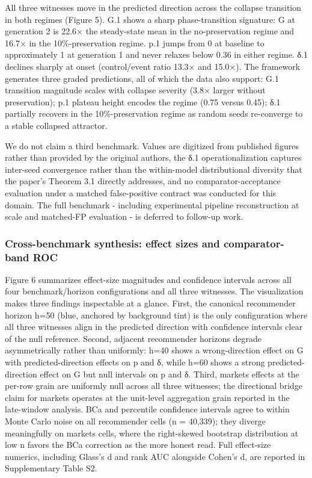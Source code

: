 \documentclass[
  11pt,
]{article}
\begin{document}
All three witnesses move in the predicted direction across the collapse
transition in both regimes (Figure 5). G.1 shows a sharp
phase-transition signature: \textbar G\textbar{} at generation 2 is
22.6× the steady-state mean in the no-preservation regime and 16.7× in
the 10\%-preservation regime. p.1 jumps from 0 at baseline to
approximately 1 at generation 1 and never relaxes below 0.36 in either
regime. δ.1 declines sharply at onset (control/event ratio 13.3× and
15.0×). The framework generates three graded predictions, all of which
the data also support: G.1 transition magnitude scales with collapse
severity (3.8× larger without preservation); p.1 plateau height encodes
the regime (0.75 versus 0.45); δ.1 partially recovers in the
10\%-preservation regime as random seeds re-converge to a stable
collapsed attractor.

We do not claim a third benchmark. Values are digitized from published
figures rather than provided by the original authors, the δ.1
operationalization captures inter-seed convergence rather than the
within-model distributional diversity that the paper's Theorem 3.1
directly addresses, and no comparator-acceptance evaluation under a
matched false-positive contract was conducted for this domain. The full
benchmark - including experimental pipeline reconstruction at scale and
matched-FP evaluation - is deferred to follow-up work.

\subsubsection{Cross-benchmark synthesis: effect sizes and
comparator-band
ROC}\label{cross-benchmark-synthesis-effect-sizes-and-comparator-band-roc}

Figure 6 summarizes effect-size magnitudes and confidence intervals
across all four benchmark/horizon configurations and all three
witnesses. The visualization makes three findings inspectable at a
glance. First, the canonical recommender horizon h=50 (blue, anchored by
background tint) is the only configuration where all three witnesses
align in the predicted direction with confidence intervals clear of the
null reference. Second, adjacent recommender horizons degrade
asymmetrically rather than uniformly: h=40 shows a wrong-direction
effect on G with predicted-direction effects on p and δ, while h=60
shows a strong predicted-direction effect on G but null intervals on p
and δ. Third, markets effects at the per-row grain are uniformly null
across all three witnesses; the directional bridge claim for markets
operates at the unit-level aggregation grain reported in the late-window
analysis. BCa and percentile confidence intervals agree to within Monte
Carlo noise on all recommender cells (n = 40,339); they diverge
meaningfully on markets cells, where the right-skewed bootstrap
distribution at low n favors the BCa correction as the more honest read.
Full effect-size numerics, including Glass's d and rank AUC alongside
Cohen's d, are reported in Supplementary Table S2.
\end{document}
